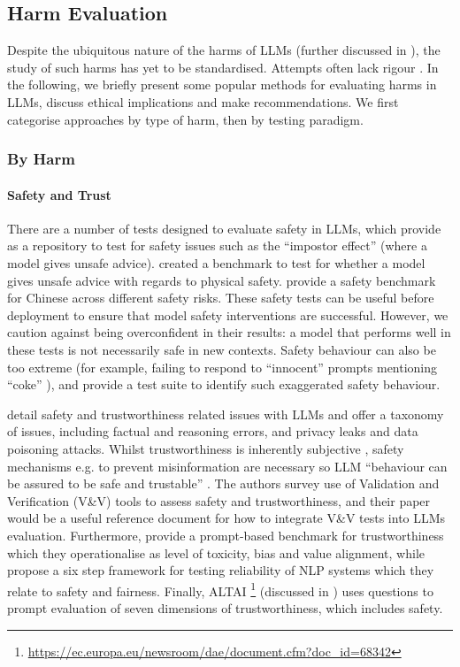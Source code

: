 \subsection{Harm Evaluation}\label{sec:harmeval}
Despite the ubiquitous nature of the harms of LLMs \citep{rauh_characteristics_2022, weidinger_ethical_2021} (further discussed in 
), the study of such harms has yet to be standardised. Attempts often lack rigour \citep{blodgett_language_2020,blodgett_stereotyping_2021,goldfarb-tarrant_this_2023}. In the following, we briefly present some popular methods for evaluating harms in LLMs, discuss ethical implications and make recommendations. We first categorise approaches by type of harm, then by testing paradigm. 

\subsubsection{By Harm}
\paragraph{Safety and Trust}
There are a number of tests designed to evaluate safety in LLMs, which \citet{dinan_safetykit_2022} provide as a repository to test for safety issues such as the ``impostor effect'' (where a model gives unsafe advice). \citet{levy_safetext_2022} created a benchmark to test for whether a model gives unsafe advice with regards to physical safety. \citet{sun_safety_2023} provide a safety benchmark for Chinese across different safety risks. These safety tests can be useful before deployment to ensure that model safety interventions are successful. However, we caution against being overconfident in their results: a model that performs well in these tests is not necessarily safe in new contexts. Safety behaviour can also be too extreme (for example, failing to respond to ``innocent'' prompts mentioning ``coke'' \citep{rottger_xstest_2024}), and \citet{rottger_xstest_2024} provide a test suite to identify such exaggerated safety behaviour. 

\citet{huang_survey_2023} detail safety and trustworthiness related issues with LLMs and offer a taxonomy of issues, including factual and reasoning errors, and privacy leaks and data poisoning attacks. Whilst trustworthiness is inherently subjective \citep{knowles_trustworthy_2023}, safety mechanisms e.g. to prevent misinformation are necessary so LLM ``behaviour can be assured to be safe and trustable'' \citep{huang_survey_2023}. The authors survey use of Validation and Verification (V\&V) tools to assess safety and trustworthiness, and their paper would be a useful reference document for how to integrate V\&V tests into LLMs evaluation.  Furthermore, \citet{huang_trustgpt_2023} provide a prompt-based benchmark for trustworthiness which they operationalise as level of toxicity, bias and value alignment, while \citet{tan_reliability_2021} propose a six step framework for testing reliability of NLP systems which they relate to safety and fairness. Finally, ALTAI \footnote{\url{https://ec.europa.eu/newsroom/dae/document.cfm?doc_id=68342}} (discussed in ) uses questions to prompt evaluation of seven dimensions of trustworthiness, which includes safety.

